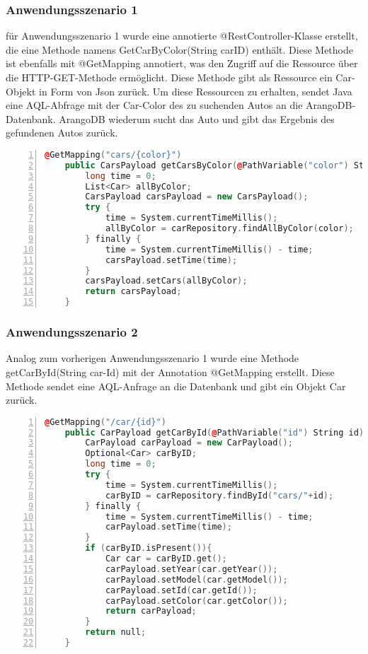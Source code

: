 \subsubsection{Anwendungsszenario 1}

für Anwendungsszenario 1 wurde eine annotierte @RestController-Klasse erstellt, die eine Methode namens GetCarByColor(String carID) enthält. Diese Methode ist ebenfalls mit @GetMapping annotiert, was den Zugriff auf die Ressource über die HTTP-GET-Methode ermöglicht. Diese Methode gibt als Ressource ein Car-Objekt in Form von Json zurück. Um diese Ressourcen zu erhalten, sendet Java eine AQL-Abfrage mit der Car-Color des zu suchenden Autos an die ArangoDB-Datenbank. ArangoDB wiederum sucht das Auto und gibt das Ergebnis des gefundenen Autos zurück. \\
\begin{lstlisting}[numbers=left,language=c++, caption={Auto nach Farbe}]
    @GetMapping("cars/{color}")
    public CarsPayload getCarsByColor(@PathVariable("color") String color){
        long time = 0;
        List<Car> allByColor;
        CarsPayload carsPayload = new CarsPayload();
        try {
            time = System.currentTimeMillis();
            allByColor = carRepository.findAllByColor(color);
        } finally {
            time = System.currentTimeMillis() - time;
            carsPayload.setTime(time);
        }
        carsPayload.setCars(allByColor);
        return carsPayload;
    }
\end{lstlisting}


\subsubsection{Anwendungsszenario 2}
Analog zum vorherigen Anwendungsszenario 1 wurde eine Methode getCarById(String car-Id) mit der Annotation @GetMapping erstellt. Diese Methode sendet eine AQL-Anfrage an die Datenbank und gibt ein Objekt Car zurück. \\
\begin{lstlisting}[numbers=left,language=c++, caption={Auto nach ID}]
    @GetMapping("/car/{id}")
    public CarPayload getCarById(@PathVariable("id") String id){
        CarPayload carPayload = new CarPayload();
        Optional<Car> carByID;
        long time = 0;
        try {
            time = System.currentTimeMillis();
            carByID = carRepository.findById("cars/"+id);
        } finally {
            time = System.currentTimeMillis() - time;
            carPayload.setTime(time);
        }
        if (carByID.isPresent()){
            Car car = carByID.get();
            carPayload.setYear(car.getYear());
            carPayload.setModel(car.getModel());
            carPayload.setId(car.getId());
            carPayload.setColor(car.getColor());
            return carPayload;
        }
        return null;
    }
\end{lstlisting}

